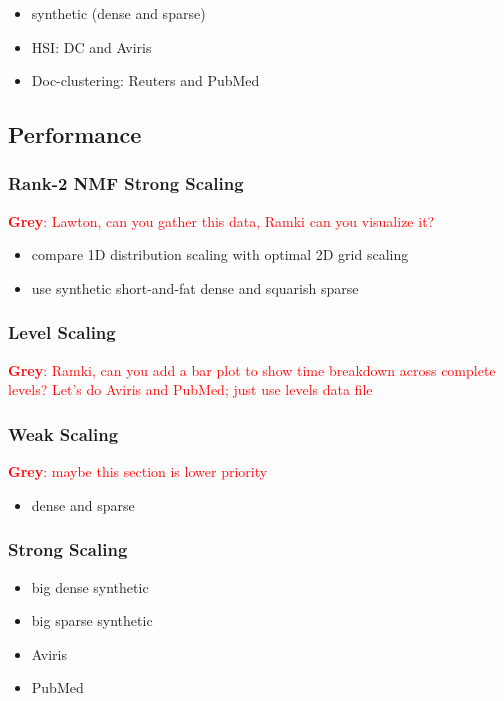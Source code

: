 \documentclass[conference,compsoc]{IEEEtran}
\newcommand{\LM}[1]{\textcolor{blue}{\textbf{Lawton}: #1}}
\newcommand{\GB}[1]{\textcolor{red}{\textbf{Grey}: #1}}
\begin{document}
\begin{itemize}
	\LM{DC: https://engineering.purdue.edu/~biehl/MultiSpec/hyperspectral.html}

	\LM{AVIRIS: https://aviris.jpl.nasa.gov/dataportal/}

	

	\item synthetic (dense and sparse)
	\item HSI: DC and Aviris
	\item Doc-clustering: Reuters and PubMed
\end{itemize}

\subsection{Performance}

\subsubsection{Rank-2 NMF Strong Scaling}

\GB{Lawton, can you gather this data, Ramki can you visualize it?}
\begin{itemize}
	\item compare 1D distribution scaling with optimal 2D grid scaling
	\item use synthetic short-and-fat dense and squarish sparse
\end{itemize}

\subsubsection{Level Scaling}

\GB{Ramki, can you add a bar plot to show time breakdown across complete levels?  Let's do Aviris and PubMed; just use levels data file}

\subsubsection{Weak Scaling}

\GB{maybe this section is lower priority}
\begin{itemize}
	\item dense and sparse
\end{itemize}

\subsubsection{Strong Scaling}

\begin{itemize}
	\item big dense synthetic
	\item big sparse synthetic
	\item Aviris
	\item PubMed
\end{itemize}
\end{document}
